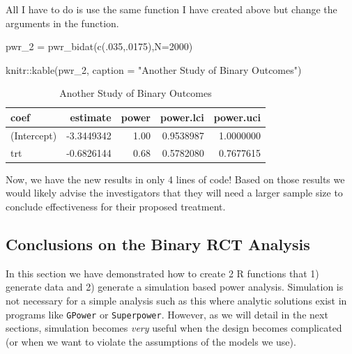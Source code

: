\documentclass[
]{book}
\newenvironment{Shaded}{\begin{snugshade}}{\end{snugshade}}
\newcommand{\AttributeTok}[1]{\textcolor[rgb]{0.77,0.63,0.00}{#1}}
\newcommand{\DecValTok}[1]{\textcolor[rgb]{0.00,0.00,0.81}{#1}}
\newcommand{\FunctionTok}[1]{\textcolor[rgb]{0.00,0.00,0.00}{#1}}
\newcommand{\NormalTok}[1]{#1}
\newcommand{\OtherTok}[1]{\textcolor[rgb]{0.56,0.35,0.01}{#1}}
\newcommand{\SpecialCharTok}[1]{\textcolor[rgb]{0.00,0.00,0.00}{#1}}
\newcommand{\StringTok}[1]{\textcolor[rgb]{0.31,0.60,0.02}{#1}}
\begin{document}
All I have to do is use the same function I have created above but change the arguments in the function.

\begin{Shaded}
\begin{Highlighting}[]
\NormalTok{pwr\_2 }\OtherTok{=} \FunctionTok{pwr\_bidat}\NormalTok{(}\FunctionTok{c}\NormalTok{(.}\DecValTok{035}\NormalTok{,.}\DecValTok{0175}\NormalTok{),}\AttributeTok{N=}\DecValTok{2000}\NormalTok{)}

\NormalTok{knitr}\SpecialCharTok{::}\FunctionTok{kable}\NormalTok{(pwr\_2,}
             \AttributeTok{caption =} \StringTok{"Another Study of Binary Outcomes"}\NormalTok{)}
\end{Highlighting}
\end{Shaded}

\begin{table}

\caption{\label{tab:unnamed-chunk-320}Another Study of Binary Outcomes}
\centering
\begin{tabular}[t]{l|r|r|r|r}
\hline
coef & estimate & power & power.lci & power.uci\\
\hline
(Intercept) & -3.3449342 & 1.00 & 0.9538987 & 1.0000000\\
\hline
trt & -0.6826144 & 0.68 & 0.5782080 & 0.7677615\\
\hline
\end{tabular}
\end{table}

Now, we have the new results in only 4 lines of code! Based on those results we would likely advise the investigators that they will need a larger sample size to conclude effectiveness for their proposed treatment.

\hypertarget{conclusions-on-the-binary-rct-analysis}{%
\subsection{Conclusions on the Binary RCT Analysis}\label{conclusions-on-the-binary-rct-analysis}}

In this section we have demonstrated how to create 2 R functions that 1) generate data and 2) generate a simulation based power analysis. Simulation is not necessary for a simple analysis such as this where analytic solutions exist in programs like \texttt{GPower} or \texttt{Superpower}. However, as we will detail in the next sections, simulation becomes \emph{very} useful when the design becomes complicated (or when we want to violate the assumptions of the models we use).
\end{document}
